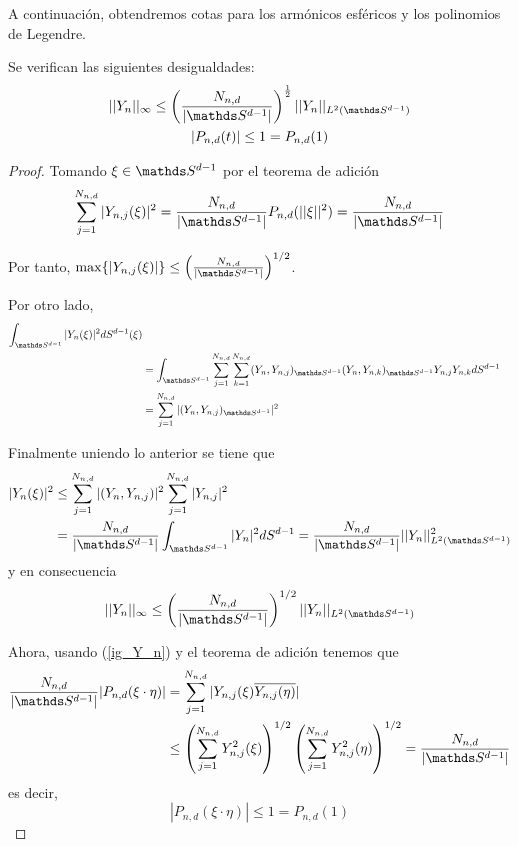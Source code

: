 A continuación, obtendremos cotas para los armónicos esféricos y los polinomios de Legendre.
\begin{prop}Se verifican las siguientes desigualdades:
	\begin{gather}
		||Y_n||_\infty \le \left(\frac{N_{n,d}}{|\sphere|}\right)^{\frac{1}{2}}||Y_n||_{L^2(\sphere)} \\
		|P_{n,d}(t)| \le 1 = P_{n,d}(1)
	\end{gather}
\end{prop}
\begin{proof}Tomando $\xi \in \sphere$ por el teorema de adición 
	\begin{gather}\label{ig_Y_n}
		\sum_{j=1}^{N_{n,d}} |Y_{n,j}(\xi)|^2 = \frac{N_{n,d}}{|\sphere|} P_{n,d}(||\xi||^2) = \frac{N_{n,d}}{|\sphere|}
	\end{gather}

Por tanto, $\max\{|Y_{n,j}(\xi)|\}\le \left(\frac{N_{n,d}}{|\sphere|}\right)^{1/2}$.
\medskip

Por otro lado, 
\begin{gather*}
\begin{aligned}
\sphint |Y_n(\xi)|^2 dS^{d-1}(\xi) \\&= \sphint \sum_{j=1}^{N_{n,d}} \sum_{k=1}^{N_{n,d}}(Y_n,Y_{n,j})_{\sphere}(Y_n,Y_{n,k})_{\sphere}Y_{n,j}Y_{n,k}dS^{d-1} \\&=\sum_{j=1}^{N_{n,d}}|(Y_n,Y_{n,j})_{\sphere}|^2
\end{aligned}
\end{gather*}

Finalmente uniendo lo anterior se tiene que 
\begin{gather*}
\begin{aligned}
|Y_n(\xi)|^2 &\le \sum_{j=1}^{N_{n,d}}|(Y_n,Y_{n,j})|^2\sum_{j=1}^{N_{n,d}}|Y_{n,j}|^2 \\&=\frac{N_{n,d}}{|\sphere|} \sphint |Y_n|^2 dS^{d-1}  =\frac{N_{n,d}}{|\sphere|}||Y_n||^2_{L^2(\sphere)}
\end{aligned}
\end{gather*}
y en consecuencia 
$$  ||Y_n||_{\infty} \le \left(\frac{N_{n,d}}{|\sphere|}\right)^{1/2} ||Y_n||_{L^2(\sphere)}$$

Ahora, usando (\ref{ig_Y_n}) y el teorema de adición tenemos que
\begin{gather*}
\begin{aligned}
\frac{N_{n,d}}{|\sphere|}|P_{n,d}(\xi\cdot\eta)| &= \sum_{j=1}^{N_{n,d}}|Y_{n,j}(\xi)\overline{Y_{n,j}(\eta)}| \\ &\le   \left(\sum_{j=1}^{N_{n,d}} Y^2_{n,j}(\xi)\right)^{1/2}\left(\sum_{j=1}^{N_{n,d}} Y^2_{n,j}(\eta)\right)^{1/2} = \frac{N_{n,d}}{|\sphere|}
\end{aligned}
\end{gather*}
es decir, 
$$
|P_{n,d}(\xi\cdot\eta)| \le 1 = P_{n,d}(1)
$$
\end{proof}
